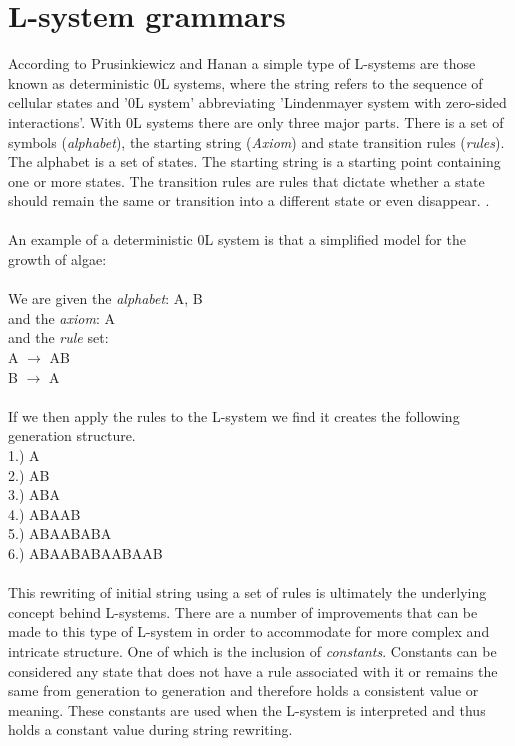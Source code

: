 \section{L-system grammars}

According to Prusinkiewicz and Hanan a simple type of L-systems are those known as deterministic 0L systems, where the string refers to the sequence of cellular states and '0L system' abbreviating 'Lindenmayer system with zero-sided interactions'.  With 0L systems there are only three major parts. There is a set of symbols (\textit{alphabet}), the starting string (\textit{Axiom}) and state transition rules (\textit{rules}). The alphabet is a set of states. The starting string is a starting point containing one or more states. The transition rules are rules that dictate whether a state should remain the same or transition into a different state or even disappear. \cite{prusinkiewicz2013lindenmayer}. \\
\\
An example of a deterministic 0L system is that a simplified model for the growth of algae: \\
\\
We are given the \textit{alphabet}: A, B \\ 
and the \textit{axiom}: A \\
and the \textit{rule} set: \\ 
A $\rightarrow$ AB \\
B $\rightarrow$ A \\
\\
If we then apply the rules to the L-system we find it creates the following generation structure. \\
1.) A \\
2.) AB \\
3.) ABA \\
4.) ABAAB \\
5.) ABAABABA \\
6.) ABAABABAABAAB \\
\\
This rewriting of initial string using a set of rules is ultimately the underlying concept behind L-systems. There are a number of improvements that can be made to this type of L-system in order to accommodate for more complex and intricate structure. One of which is the inclusion of \textit{constants}. Constants can be considered any state that does not have a rule associated with it or remains the same from generation to generation and therefore holds a consistent value or meaning. These constants are used when the L-system is interpreted and thus holds a constant value during string rewriting.

